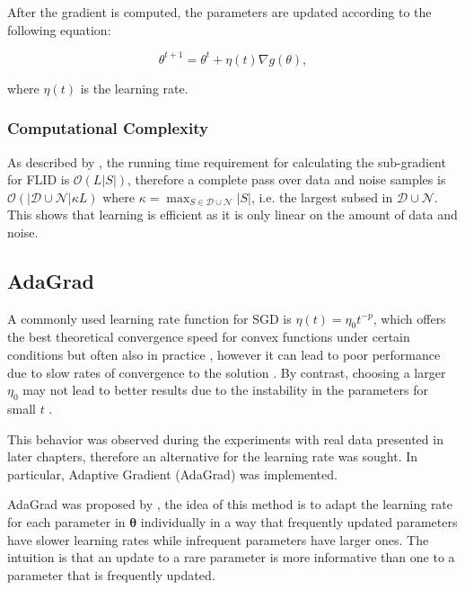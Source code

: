 After the gradient is computed, the parameters are updated according to the following equation:

\begin{equation}
  \theta^{t+1} = \theta^{t} + \eta(t) \nabla g(\theta),
\end{equation}

where $\eta(t)$ is the learning rate.

\subsubsection{Computational Complexity}

As described by \citet{tschiatschek16learning}, the running time requirement for calculating the sub-gradient for FLID is $\mathcal{O}(L|S|)$, therefore a complete pass over data and noise samples is $\mathcal{O}(|\mathcal{D}\cup\mathcal{N}|\kappa L)$ where $\kappa = \max_{S \in \mathcal{D}\cup\mathcal{N}}{|S|}$, i.e. the largest subsed in $\mathcal{D} \cup \mathcal{N}$. This shows that learning is efficient as it is only linear on the amount of data and noise.

\subsection{AdaGrad}
\label{sec:adagrad}

A commonly used learning rate function for SGD is $\eta(t) = \eta_{0}t^{-p}$, which offers the best theoretical convergence speed for convex functions under certain conditions but often also in practice \citep{bottou2012stochastic}, however it can lead to poor performance due to slow rates of convergence to the solution \citep{darken1992towards}. By contrast, choosing a larger $\eta_{0}$ may not lead to better results due to the instability in the parameters for small $t$ \citep{Darken1990}. 

This behavior was observed during the experiments with real data presented in later chapters, therefore an alternative for the learning rate was sought. In particular, Adaptive Gradient (AdaGrad) was implemented.

AdaGrad was proposed by \citet{Duchi2011adagrad}, the idea of this method is to adapt the learning rate for each parameter in $\boldsymbol{\theta}$ individually in a way that frequently updated parameters have slower learning rates while infrequent parameters have larger ones. The intuition is that an update to a rare parameter is more informative than one to a parameter that is frequently updated.


